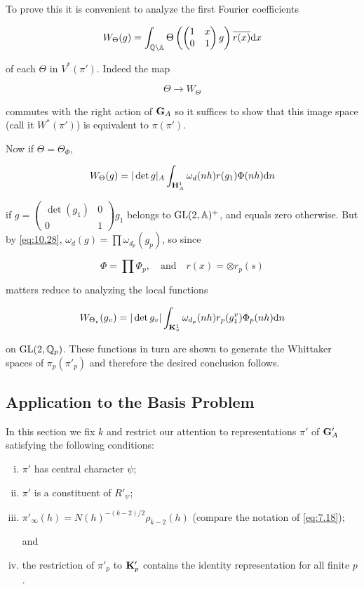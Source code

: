 To prove this it is convenient to analyze the first Fourier coefficients

\[
W_\Theta(g) = \int_{\mathbb{Q} \backslash \mathbb{A}} \Theta\left(\begin{pmatrix} 1 & x \\ 0 & 1 \end{pmatrix} g\right)\overline{r(x)} \mathrm{d} x
\]

of each $\Theta$ in $V^*(\pi')$. Indeed the map

\[
\Theta \to W_\Theta
\]

commutes with the right action of $\mathbf{G}_A$ so it suffices to show that this image space (call it $W^*(\pi')$) is equivalent to $\pi(\pi')$.

Now if $\Theta = \Theta_\Phi$,

\[
W_\Theta(g) = |\det g|_A \int_{\mathbf{H}_A^1} \omega_d(nh)r(g_1)\Phi(nh) \mathrm{d} n
\]

if $g = \begin{pmatrix} \det(g_1) & 0 \\ 0 & 1 \end{pmatrix}g_1$ belongs to $\operatorname{GL}(2, \mathbb{A})^+$, and equals zero otherwise. But by \eqref{eq:10.28}, $\omega_d(g) = \prod \omega_{d_p}(g_p)$, so since

\[
\Phi = \prod \Phi_p, \quad \text{and} \quad r(x) = \otimes r_p(s)
\]

matters reduce to analyzing the local functions

\[
W_{\Theta_v}(g_v) = |\det g_v| \int_{\mathbf{K}_v^1} \omega_{d_p}(nh)r_p(g_1^v)\Phi_p(nh) \mathrm{d} n
\]

on $\operatorname{GL}(2, \mathbb{Q}_p)$. These functions in turn are shown to generate the Whittaker spaces of $\pi_p(\pi'_p)$ and therefore the desired conclusion follows.

\subsection{Application to the Basis Problem}

In this section we fix $k$ and restrict our attention to representations $\pi'$ of $\mathbf{G}'_A$ satisfying the following conditions:

\begin{enumerate}[(i)]

\item $\pi'$ has central character $\psi$;

\item $\pi'$ is a constituent of $R'_\psi$;

\item $\pi'_\infty(h) = N(h)^{-(k-2)/2}\rho_{k-2}(h)$ (compare the notation of \eqref{eq:7.18});

and

\item the restriction of $\pi'_p$ to $\mathbf{K}'_p$ contains the identity representation for all finite $p$.

\end{enumerate}

